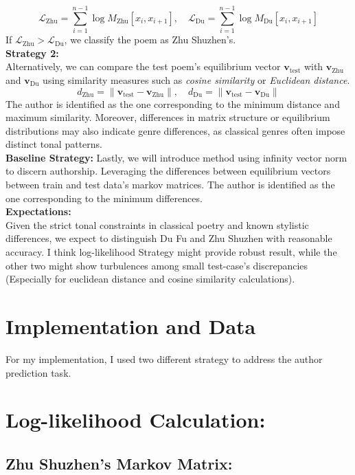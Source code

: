 \documentclass[12pt]{article}
\begin{document}
\[
    \mathcal{L}_{\text{Zhu}} = \sum_{i=1}^{n-1} \log M_{\text{Zhu}}[x_i, x_{i+1}], \quad \mathcal{L}_{\text{Du}} = \sum_{i=1}^{n-1} \log M_{\text{Du}}[x_i, x_{i+1}]
\]
If $\mathcal{L}_{\text{Zhu}} > \mathcal{L}_{\text{Du}}$, we classify the poem as Zhu Shuzhen's.
\\
\textbf{Strategy 2: }
\\
Alternatively, we can compare the test poem’s equilibrium vector $\mathbf{v}_{\text{test}}$ with $\mathbf{v}_{\text{Zhu}}$ and $\mathbf{v}_{\text{Du}}$ using similarity measures such as \textit{cosine similarity} or \textit{Euclidean distance}.
\[
    d_{\text{Zhu}} = \|\mathbf{v}_{\text{test}} - \mathbf{v}_{\text{Zhu}}\|, \quad d_{\text{Du}} = \|\mathbf{v}_{\text{test}} - \mathbf{v}_{\text{Du}}\|
\]
The author is identified as the one corresponding to the minimum distance and maximum similarity. Moreover, differences in matrix structure or equilibrium distributions may also indicate genre differences, as classical genres often impose distinct tonal patterns.
\\
\textbf{Baseline Strategy: }
Lastly, we will introduce method using infinity vector norm to discern authorship. Leveraging the differences between equilibrium vectors between train and test data's markov matrices.
The author is identified as the one corresponding to the minimum differences.
\\
\textbf{Expectations: }
\\
Given the strict tonal constraints in classical poetry and known stylistic differences, we expect to distinguish Du Fu and Zhu Shuzhen with reasonable accuracy. 
I think log-likelihood Strategy might provide robust result, while the other two might show turbulences among small test-case's discrepancies (Especially for euclidean distance and cosine similarity calculations).

\section{Implementation and Data}
\noindent For my implementation, I used two different strategy to address the author prediction task.

\section*{Log-likelihood Calculation: }

\subsection*{Zhu Shuzhen's Markov Matrix:}
\end{document}
